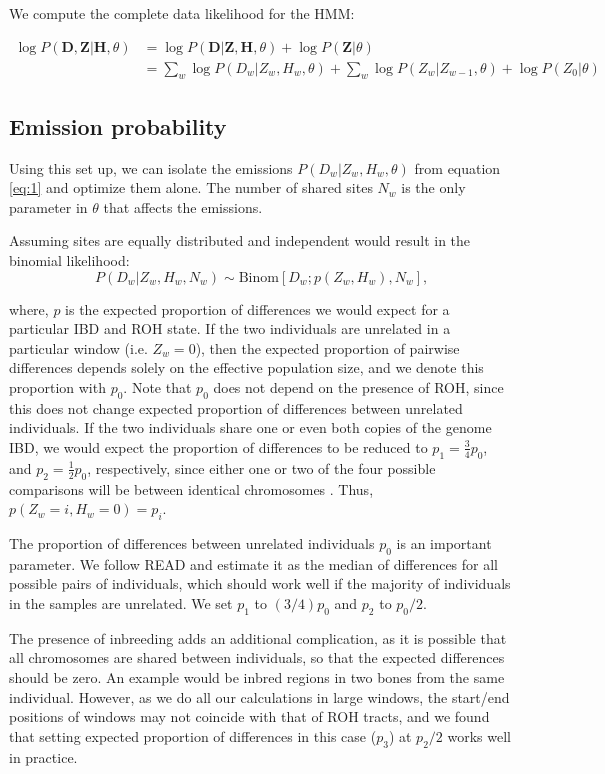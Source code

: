 \documentclass[12pt, letterpaper]{article}
\newcommand{\BZ}{\mathbf{Z}}
\newcommand{\BD}{\mathbf{D}}
\newcommand{\BH}{\mathbf{H}}
\begin{document}
We compute the complete data likelihood for the HMM:

\begin{align}\label{eq:1}
\log P(\BD,\BZ|\BH, \theta) &= \log P(\BD|\BZ,\BH, \theta) + \log P(\BZ |\theta) \nonumber\\
&= \sum_w \log P(D_w|Z_w,H_w, \theta) + \sum_w \log P(Z_w |Z_{w-1},\theta) + \log P(Z_0|\theta)
\end{align}

\subsection{Emission probability}
Using this set up, we can isolate the emissions $P(D_w | Z_w, H_w ,\theta)$ from equation \ref{eq:1} and optimize them alone. The number of shared sites $N_w$ is the only parameter in $\theta$ that affects the emissions. 

Assuming sites are equally distributed and independent would result in the binomial likelihood:
$$P(D_w|Z_w, H_w, N_w) \sim \text{Binom}[D_w ; p(Z_w, H_w), N_w] \text{,}$$

where, $p$ is the expected proportion of differences we would expect for a particular IBD and ROH state. If the two individuals are unrelated in a particular window (i.e. $Z_w = 0$), then the expected proportion of pairwise differences depends solely on the effective population size, and we denote this proportion with $p_0$. Note that $p_0$ does not depend on the presence of ROH, since this does not change expected proportion of differences between unrelated individuals. If the two individuals share one or even both copies of the genome IBD, we would expect the proportion of differences to be reduced to $p_1 = \frac{3}{4} p_0$, and $p_2 = \frac{1}2 p_0$, respectively, since either one or two of the four possible comparisons will be between identical chromosomes \cite{kuhn_estimating_2018}. Thus, $p(Z_w=i, H_w=0) = p_i$.

The proportion of differences between unrelated individuals $p_0$ is an important parameter. We follow READ \cite{kuhn_estimating_2018} and estimate it as the median of differences for all possible pairs of individuals, which should work well if the majority of individuals in the samples are unrelated. We set $p_1$ to $(3/4)p_0$ and $p_2$ to $p_0/2$. 

The presence of inbreeding adds an additional complication, as it is possible that all chromosomes are shared between individuals, so that the expected differences should be zero. An example would be inbred regions in two bones from the same individual. However, as we do all our calculations in large windows, the start/end positions of windows may not coincide with that of ROH tracts, and we found that setting expected proportion of differences in this case ($p_3$) at $p_2/2$ works well in practice.
\end{document}
